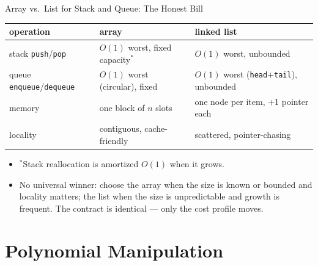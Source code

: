 \documentclass[aspectratio=169]{beamer}
\begin{document}
\begin{frame}{Array vs.\ List for Stack and Queue: The Honest Bill}
  \begin{center}
  {\footnotesize
  \begin{tabular}{lll}
    \toprule
    \textbf{operation} & \textbf{array} & \textbf{linked list} \\
    \midrule
    stack \texttt{push}/\texttt{pop} & $O(1)$ worst, fixed capacity$^{*}$ & $O(1)$ worst, unbounded \\
    queue \texttt{enqueue}/\texttt{dequeue} & $O(1)$ worst (circular), fixed & $O(1)$ worst (\texttt{head}+\texttt{tail}), unbounded \\
    memory & one block of $n$ slots & one node per item, +1 pointer each \\
    locality & contiguous, cache-friendly & scattered, pointer-chasing \\
    \bottomrule
  \end{tabular}}
  \end{center}
  \begin{itemize}
    \item $^{*}$Stack reallocation is amortized $O(1)$ when it grows.
    \item No universal winner: choose the array when the size is known or
      bounded and locality matters; the list when the size is unpredictable
      and growth is frequent. The contract is identical --- only the cost
      profile moves.
  \end{itemize}
\end{frame}


\section{Polynomial Manipulation}

\end{document}

